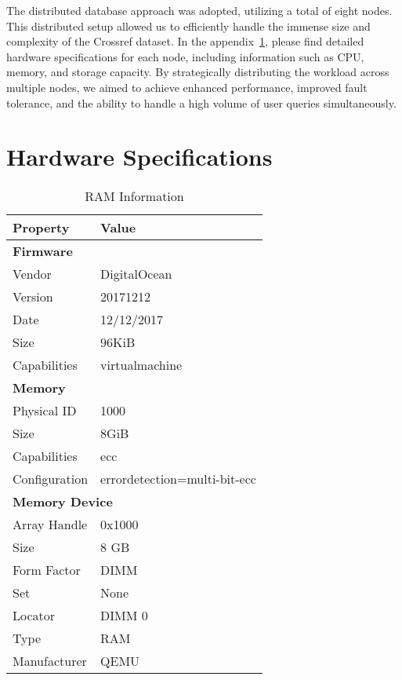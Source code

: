 \documentclass{article}
\begin{document}
The distributed database approach was adopted, utilizing a total of eight nodes. 
This distributed setup allowed us to efficiently handle the immense size and complexity of the 
Crossref dataset. In the appendix~\ref{apx:hardware-specs}, please find detailed hardware 
specifications for each node, including information such as CPU, memory, and storage capacity. 
By strategically distributing the workload across multiple nodes, we aimed to achieve enhanced 
performance, improved fault tolerance, and the ability to handle a high volume of user queries 
simultaneously. 

\appendix
\section{Hardware Specifications}
\label{apx:hardware-specs}
\begin{table}[htbp]
    \centering
    \caption{RAM Information}
    \begin{tabular}{ll}
      \toprule
      \textbf{Property} & \textbf{Value} \\
      \midrule
      \multicolumn{2}{l}{\textbf{Firmware}} \\
      Vendor & DigitalOcean \\
      Version & 20171212 \\
      Date & 12/12/2017 \\
      Size & 96KiB \\
      Capabilities & virtualmachine \\
      \midrule
      \multicolumn{2}{l}{\textbf{Memory}} \\
      Physical ID & 1000 \\
      Size & 8GiB \\
      Capabilities & ecc \\
      Configuration & errordetection=multi-bit-ecc \\
      \midrule
      \multicolumn{2}{l}{\textbf{Memory Device}} \\
      Array Handle & 0x1000 \\
      Size & 8 GB \\
      Form Factor & DIMM \\
      Set & None \\
      Locator & DIMM 0 \\
      Type & RAM \\
      Manufacturer & QEMU \\
      \bottomrule
    \end{tabular}
  \end{table}
\end{document}
